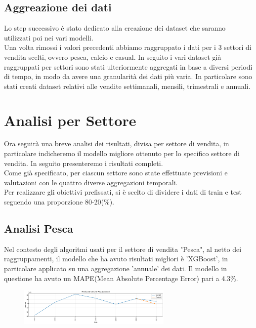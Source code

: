 \documentclass[12pt, a4paper, twocolumn]{article} %
\begin{document}
\subsection{Aggreazione dei dati}
Lo step successivo è stato dedicato alla creazione dei dataset che saranno utilizzati poi nei vari modelli.\\
Una volta rimossi i valori precedenti abbiamo raggruppato i dati per i 3 settori di vendita scelti, ovvero pesca, calcio e casual. In seguito i vari dataset già raggruppati per settori sono stati ulteriormente aggregati in base a diversi periodi di tempo, in modo da avere una granularità dei dati più varia. In particolare sono stati creati dataset relativi alle vendite settimanali, mensili, trimestrali e annuali.

\section{Analisi per Settore}
Ora seguirà una breve analisi dei risultati, divisa per settore di vendita, in particolare indicheremo il modello migliore ottenuto per lo specifico settore di vendita. In seguito presenteremo i risultati completi.\\
Come già specificato, per ciascun settore sono state effettuate previsioni e valutazioni con le quattro diverse aggregazioni temporali.\\
Per realizzare gli obiettivi prefissati, si è scelto di dividere i dati di train e test seguendo una proporzione 80-20(\%).

\subsection{Analisi Pesca}
Nel contesto degli algoritmi usati per il settore di vendita "Pesca", al netto dei raggruppamenti, il modello che ha avuto risultati migliori è 'XGBoost', in particolare applicato su una aggregazione 'annuale' dei dati. Il modello in questione ha avuto un MAPE(Mean Absolute Percentage Error) pari a 4.3\%.
\begin{figure}
  \caption{}
  \begin{center}
    \includegraphics[width=75mm,scale=0.5]{pesca_annuale_4.31_xgbost_noValori}
  \end{center}
\end{figure}
\end{document}

